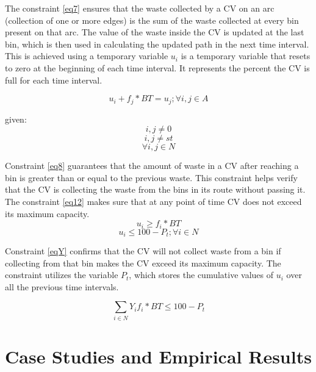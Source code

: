 \documentclass[12pt]{article}
\begin{document}
The constraint \eqref{eq7} ensures that the waste collected by a CV on an arc (collection of one or more edges) is the sum of the waste collected at every bin present on that arc. The value of the waste inside the CV is updated at the last bin, which is then used in calculating the updated path in the next time interval. This is achieved using a temporary variable $u_i$ is a temporary variable that resets to zero at the beginning of each time interval. It represents the percent the CV is full for each time interval. 

\begin{equation}\label{eq7}
    u_i+f_j*BT =u_j ; \forall i,j \in A 
\end{equation}

given: 
$$ i,j\ne 0$$
$$ i,j \ne st $$
$$  \forall i,j\in N$$

Constraint \eqref{eq8} guarantees that the amount of waste in a CV after reaching a bin is greater than or equal to the previous waste. This constraint helps verify that the CV is collecting the waste from the bins in its route without passing it.
The constraint \eqref{eq12} makes sure that at any point of time CV does not exceed its maximum capacity. 
\begin{equation}\label{eq8}
    u_i\ge f_i*BT
\end{equation}
\begin{equation}\label{eq12}
    u_i\le 100 - P_t ; \forall i \in N
\end{equation}

Constraint \eqref{eqY} confirms that the CV will not collect waste from a bin if collecting from that bin makes the CV exceed its maximum capacity. The constraint utilizes the variable $P_t$, which stores the cumulative values of $u_i$ over all the previous time intervals.

\begin{equation}\label{eqY}
	\sum_{i\in N}Y_i f_i* BT\le100-P_t
\end{equation}




\section{Case Studies and Empirical Results}
\end{document}
